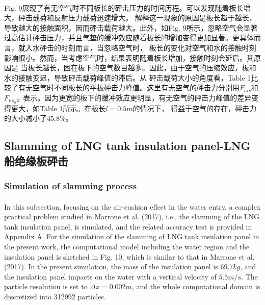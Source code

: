 \documentclass[UTF8]{ctexart}
\begin{document}
\paragraph{\quad}Fig. 9展现了有无空气时不同板长的砰击压力的时间历程。可以发现随着板长增大，砰击载荷和反射压力载荷迅速增大。
                解释这一现象的原因是板长趋于越长，导致越大的接触面积，因而砰击载荷越大。此外，如Fig. 9所示，忽略空气会显著
                过高估计砰击压力，并且气垫的缓冲效应随着板长的增加变得更加显著。更具体而言，就入水砰击的时刻而言，当忽略空气时，
                板长的变化对空气和水的接触时刻影响很小。然而，当考虑空气时，结果表明随着板长增加，接触时刻会延后。其原因是
                当板长越长，困在板下的空气数目越多。因此，由于空气的压缩效应，板和水的接触变迟，导致砰击载荷峰值的滞后。从
                砰击载荷大小的角度看，Table 1比较了有无空气时不同板长的平板砰击力峰值。这里有无空气的砰击力分别用$F_{air}$和$F_{no_air}$
                表示。因为更宽的板下的缓冲效应更明显，有无空气的砰击力峰值的差异变得更大，如Table 1所示。在板长$l = 0.5m$的情况下，
                得益于空气的存在，砰击力的大小减小了45.8\%。

\subsection{Slamming of LNG tank insulation panel-LNG船绝缘板砰击}
\subsubsection{Simulation of slamming process}
\paragraph{\quad}In this subsection, focusing on the air-cushion effect in the water entry, 
                a complex practical problem studied in Marrone et al. (2017), i.e., the slamming 
                of the LNG tank insulation panel, is simulated, and the related accuracy test is 
                provided in Appendix A. For the simulation of the slamming of LNG tank insulation 
                panel in the present work, the computational model including the water region and 
                the insulation panel is sketched in Fig. 10, which is similar to that in Marrone 
                et al. (2017). In the present simulation, the mass of the insulation panel is $69.7 kg$, 
                and the insulation panel impacts on the water with a vertical velocity of $5.5 m/s$. 
                The particle resolution is set to $\Delta x = 0.002m$, and the whole computational domain 
                is discretized into 312992 particles.
\end{document}
